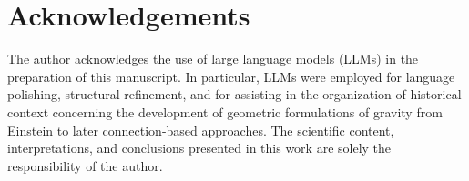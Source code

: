 \documentclass[%
 reprint,
 amsmath,amssymb,
 aps,
 prb,
]{revtex4-2}
\numberwithin{equation}{section}
\begin{document}
\section*{Acknowledgements}

The author acknowledges the use of large language models (LLMs) in the preparation of this manuscript. In particular, LLMs were employed for language polishing, structural refinement, and for assisting in the organization of historical context concerning the development of geometric formulations of gravity from Einstein to later connection-based approaches. The scientific content, interpretations, and conclusions presented in this work are solely the responsibility of the author.

\clearpage
\end{document}
